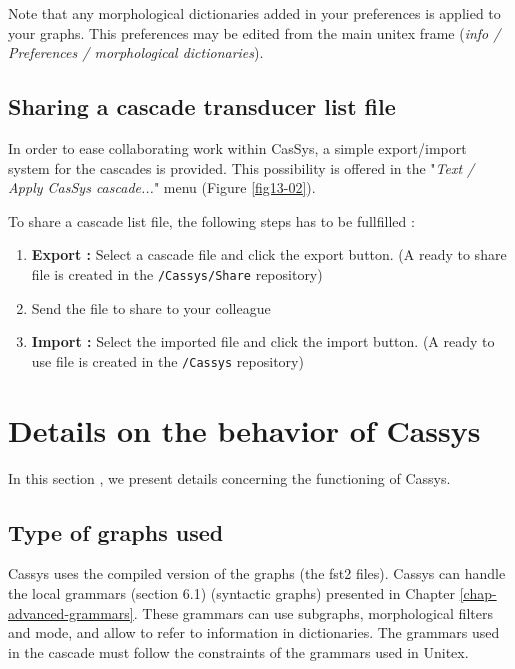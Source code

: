 Note that any morphological dictionaries added in your preferences is applied to your
graphs. This preferences may be edited from the main unitex frame (\textit{info / Preferences / morphological dictionaries}).

\subsection{Sharing a cascade transducer list file}
\label{subsec:shareCascade}

In order to ease collaborating work within CasSys, a  simple export/import
system for the cascades is provided. This possibility is offered in the "\textit{Text / Apply CasSys cascade...}" menu (Figure \ref{fig13-02}).

To share a cascade list file, the following steps has to be fullfilled :
\begin{enumerate}
  \item \textbf{Export :} Select a cascade file and click the export button. (A
  ready to share file is created in the \texttt{/Cassys/Share} repository)
  \item Send the file to share to your colleague
  \item \textbf{Import :} Select the imported file and click the import button.
  (A ready to use file is created in the \texttt{/Cassys} repository)
\end{enumerate}


\section{Details on the behavior of Cassys}

In this section , we present details concerning the functioning of Cassys.

\subsection{Type of graphs used}

Cassys uses the compiled version of the graphs (the fst2 files).
Cassys can handle the local grammars (section 6.1) (syntactic graphs) presented in Chapter \ref{chap-advanced-grammars}. These grammars can use subgraphs, morphological filters and mode, and allow to refer to information in dictionaries. 
The grammars used in the cascade must follow the constraints of the grammars used in Unitex.

